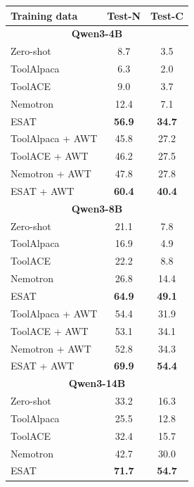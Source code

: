 \begin{table}[t!]
\centering
\small
\begin{minipage}[c]{0.49\linewidth}
\centering
\begin{tabular}[c]{lcc}
\toprule
\bf{Training data} & \bf{Test-N} & \bf{Test-C} \\
\midrule
\multicolumn{3}{c}{\bf Qwen3-4B}\\
\midrule
Zero-shot & 8.7 & 3.5 \\
ToolAlpaca           & 6.3     & 2.0     \\
ToolACE & 9.0 & 3.7\\
Nemotron             & 12.4     &  7.1     \\
\textsc{ESAT}       &  \bf 56.9 &  \bf 34.7 \\
\midrule
ToolAlpaca + AWT     & 45.8 & 27.2 \\
ToolACE + AWT              & 46.2 & 27.5 \\
Nemotron + AWT       & 47.8 & 27.8 \\
\textsc{ESAT} + AWT & \bf 60.4    & \bf 40.4
\\
\midrule
\multicolumn{3}{c}{\bf Qwen3-8B}\\
\midrule
Zero-shot & 21.1 & 7.8 \\
ToolAlpaca           & 16.9     &  4.9    \\
ToolACE              & 22.2     &  8.8    \\
Nemotron             & 26.8     &  14.4    \\
\textsc{ESAT}       &  \bf 64.9 &  \bf 49.1 \\
\midrule
ToolAlpaca + AWT     & 54.4 & 31.9 \\
ToolACE + AWT        & 53.1 & 34.1 \\
Nemotron + AWT       & 52.8 & 34.3 \\
\textsc{ESAT} + AWT & \bf 69.9     & \bf  54.4\\
\midrule
\multicolumn{3}{c}{\bf Qwen3-14B}\\
\midrule
Zero-shot & 33.2 & 16.3 \\
ToolAlpaca           & 25.5     & 12.8     \\
ToolACE              & 32.4     & 15.7  \\
Nemotron             & 42.7     &   30.0   \\
\textsc{ESAT}       &  \bf 71.7 &  \bf 54.7 \\

\end{tabular}
\end{minipage}
\end{table}
